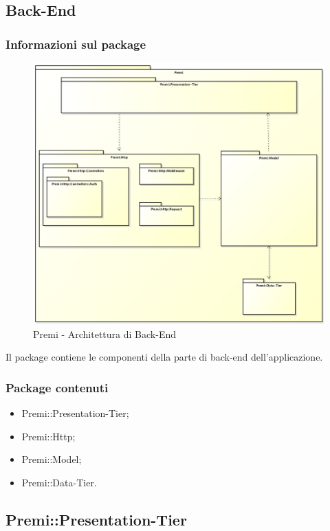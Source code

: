 \subsection{Back-End}
	\subsubsection*{Informazioni sul package}
		\begin{figure}[h]
			\centering
			\includegraphics[width=0.9\linewidth]{img/back-end_package}
			\caption[Premi::Back-End]{Premi - Architettura di Back-End}
		\end{figure}
		Il package contiene le componenti della parte di \gls{back-end} dell'applicazione.
		
	\subsubsection*{Package contenuti}
		\begin{itemize}
			\item Premi::Presentation-Tier;
			\item Premi::Http;
			\item Premi::Model;
			\item Premi::Data-Tier.
		\end{itemize}

\newpage

\subsection{Premi::Presentation-Tier}
